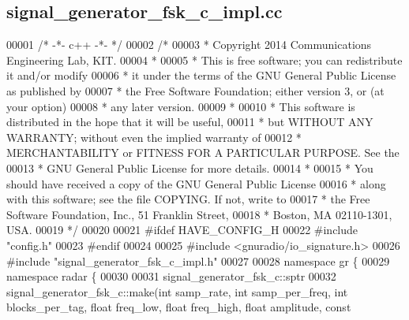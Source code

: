 \subsection{signal\+\_\+generator\+\_\+fsk\+\_\+c\+\_\+impl.\+cc}
\label{signal__generator__fsk__c__impl_8cc_source}

\begin{DoxyCode}
00001 \textcolor{comment}{/* -*- c++ -*- */}
00002 \textcolor{comment}{/* }
00003 \textcolor{comment}{ * Copyright 2014 Communications Engineering Lab, KIT.}
00004 \textcolor{comment}{ * }
00005 \textcolor{comment}{ * This is free software; you can redistribute it and/or modify}
00006 \textcolor{comment}{ * it under the terms of the GNU General Public License as published by}
00007 \textcolor{comment}{ * the Free Software Foundation; either version 3, or (at your option)}
00008 \textcolor{comment}{ * any later version.}
00009 \textcolor{comment}{ * }
00010 \textcolor{comment}{ * This software is distributed in the hope that it will be useful,}
00011 \textcolor{comment}{ * but WITHOUT ANY WARRANTY; without even the implied warranty of}
00012 \textcolor{comment}{ * MERCHANTABILITY or FITNESS FOR A PARTICULAR PURPOSE.  See the}
00013 \textcolor{comment}{ * GNU General Public License for more details.}
00014 \textcolor{comment}{ * }
00015 \textcolor{comment}{ * You should have received a copy of the GNU General Public License}
00016 \textcolor{comment}{ * along with this software; see the file COPYING.  If not, write to}
00017 \textcolor{comment}{ * the Free Software Foundation, Inc., 51 Franklin Street,}
00018 \textcolor{comment}{ * Boston, MA 02110-1301, USA.}
00019 \textcolor{comment}{ */}
00020  
00021 \textcolor{preprocessor}{#ifdef HAVE\_CONFIG\_H}
00022 \textcolor{preprocessor}{#include "config.h"}
00023 \textcolor{preprocessor}{#endif}
00024 
00025 \textcolor{preprocessor}{#include <gnuradio/io\_signature.h>}
00026 \textcolor{preprocessor}{#include "signal_generator_fsk_c_impl.h"}
00027 
00028 \textcolor{keyword}{namespace }gr \{
00029   \textcolor{keyword}{namespace }radar \{
00030 
00031     signal_generator_fsk_c::sptr
00032     signal_generator_fsk_c::make(\textcolor{keywordtype}{int} samp_rate, \textcolor{keywordtype}{int} samp_per_freq, \textcolor{keywordtype}{int} 
      blocks_per_tag, \textcolor{keywordtype}{float} freq\_low, \textcolor{keywordtype}{float} freq\_high, \textcolor{keywordtype}{float} amplitude, \textcolor{keyword}{const} 

\end{DoxyCode}
